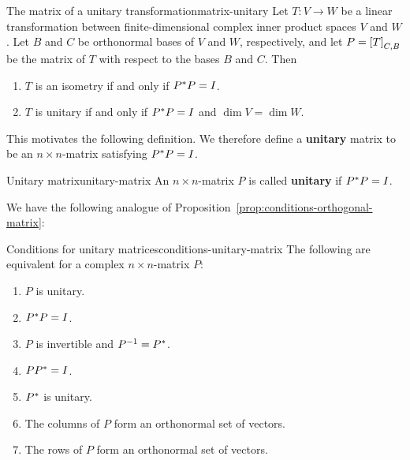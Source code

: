 \begin{proposition}{The matrix of a unitary transformation}{matrix-unitary}
  Let $T:V\to W$ be a linear transformation between finite-dimensional
  complex inner product spaces $V$ and $W$. Let $B$ and $C$ be
  orthonormal bases of $V$ and $W$, respectively, and let
  $P=\left[T\right]_{C,B}$ be the matrix of $T$ with respect to the bases
  $B$ and $C$. Then
  \begin{enumialphparenastyle}
    \begin{enumerate}
    \item $T$ is an isometry if and only if $P^{*}P = I$.
    \item $T$ is unitary if and only if $P^{*}P = I$ and
      $\dim V=\dim W$.
    \end{enumerate}
  \end{enumialphparenastyle}
\end{proposition}

This motivates the following definition.  We therefore define a
\textbf{unitary}%
 matrix to be an $n\times n$-matrix satisfying
$P^{*}P=I$.

\begin{definition}{Unitary matrix}{unitary-matrix}
  An $n\times n$-matrix $P$ is called \textbf{unitary}%
   if $P^{*}P=I$.
\end{definition}

We have the following analogue of
Proposition~\ref{prop:conditions-orthogonal-matrix}:

\begin{proposition}{Conditions for unitary matrices}{conditions-unitary-matrix}
  The following are equivalent for a complex $n\times n$-matrix $P$:
  \begin{enumialphparenastyle}
    \begin{enumerate}
    \item $P$ is unitary.
    \item $P^{*}P=I$.
    \item $P$ is invertible and $P^{-1}=P^{*}$.
    \item $PP^{*}=I$.
    \item $P^{*}$ is unitary.
    \item The columns of $P$ form an orthonormal set of vectors.
    \item The rows of $P$ form an orthonormal set of vectors.
    \end{enumerate}
  \end{enumialphparenastyle}
\end{proposition}

